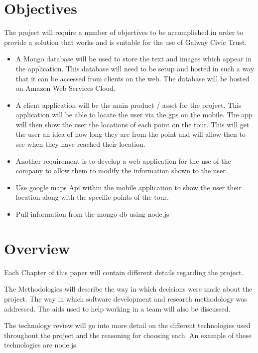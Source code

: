 \section{Objectives} 


The project will require a number of objectives to be accomplished in order to provide a solution that works and is suitable for the use of Galway Civic Trust. 

\begin{itemize}
\item A Mongo database will be used to store the text and images which appear in the application. This database will need to be setup and hosted in such a way that it can be accessed from clients on the web. The database will be hosted on Amazon Web Services Cloud.

\item A client application will be the main product / asset for the project. This application will be able to locate the user via the gps on the mobile. The app will then show the user the locations of each point on the tour. This will get the user an idea of how long they are from the point and will allow then to see when they have reached their location.

\item Another requirement is to develop a web application for the use of the company to allow them to modify the information shown to the user.

\item Use google maps Api within the mobile application to show the user their location along with the specific points of the tour.

\item Pull information from the mongo db using node.js


\end{itemize}
\section{Overview}

Each Chapter of this paper will contain different details regarding the project. 

The Methodologies will describe the way in which decisions were made about the project. The way in which software development and research methodology was addressed. The aids used to help working in a team will also be discussed.

The technology review will go into more detail on the different technologies used throughout the project and the reasoning for choosing each. An example of these technologies are node.js.

